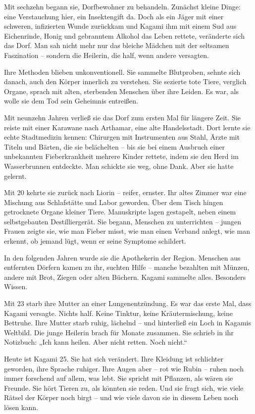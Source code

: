 \documentclass[12pt,a4paper]{article}
\begin{document}
Mit sechzehn begann sie, Dorfbewohner zu behandeln. Zunächst kleine Dinge: eine Verstauchung hier, ein Insektengift da. Doch als ein Jäger mit einer schweren, infizierten Wunde zurückkam und Kagami ihm mit einem Sud aus Eichenrinde, Honig und gebranntem Alkohol das Leben rettete, veränderte sich das Dorf. Man sah nicht mehr nur das bleiche Mädchen mit der seltsamen Faszination – sondern die Heilerin, die half, wenn andere versagten.

Ihre Methoden blieben unkonventionell. Sie sammelte Blutproben, sehnte sich danach, auch den Körper innerlich zu verstehen. Sie sezierte tote Tiere, verglich Organe, sprach mit alten, sterbenden Menschen über ihre Leiden. Es war, als wolle sie dem Tod sein Geheimnis entreißen.

Mit neunzehn Jahren verließ sie das Dorf zum ersten Mal für längere Zeit. Sie reiste mit einer Karawane nach Arthamar, eine alte Handelsstadt. Dort lernte sie echte Stadtmedizin kennen: Chirurgen mit Instrumenten aus Stahl, Ärzte mit Titeln und Bärten, die sie belächelten – bis sie bei einem Ausbruch einer unbekannten Fieberkrankheit mehrere Kinder rettete, indem sie den Herd im Wasserbrunnen entdeckte. Man schickte sie weg, ohne Dank. Aber sie hatte gelernt.

Mit 20 kehrte sie zurück nach Liorin – reifer, ernster. Ihr altes Zimmer war eine Mischung aus Schlafstätte und Labor geworden. Über dem Tisch hingen getrocknete Organe kleiner Tiere. Manuskripte lagen gestapelt, neben einem selbstgebauten Destilliergerät. Sie begann, Menschen zu unterrichten – jungen Frauen zeigte sie, wie man Fieber misst, wie man einen Verband anlegt, wie man erkennt, ob jemand lügt, wenn er seine Symptome schildert.

In den folgenden Jahren wurde sie die Apothekerin der Region. Menschen aus entfernten Dörfern kamen zu ihr, suchten Hilfe – manche bezahlten mit Münzen, andere mit Brot, Ziegen oder alten Büchern. Kagami sammelte alles. Besonders Wissen.

Mit 23 starb ihre Mutter an einer Lungenentzündung. Es war das erste Mal, dass Kagami versagte. Nichts half. Keine Tinktur, keine Kräutermischung, keine Bettruhe. Ihre Mutter starb ruhig, lächelnd – und hinterließ ein Loch in Kagamis Weltbild. Die junge Heilerin brach für Monate zusammen. Sie schrieb in ihr Notizbuch:
„Ich kann heilen. Aber nicht retten. Noch nicht.“

Heute ist Kagami 25. Sie hat sich verändert. Ihre Kleidung ist schlichter geworden, ihre Sprache ruhiger. Ihre Augen aber – rot wie Rubin – ruhen noch immer forschend auf allem, was lebt. Sie spricht mit Pflanzen, als wären sie Freunde. Sie hört Tieren zu, als könnten sie reden. Und sie fragt sich, wie viele Rätsel der Körper noch birgt – und wie viele davon sie in diesem Leben noch lösen kann.
\end{document}
